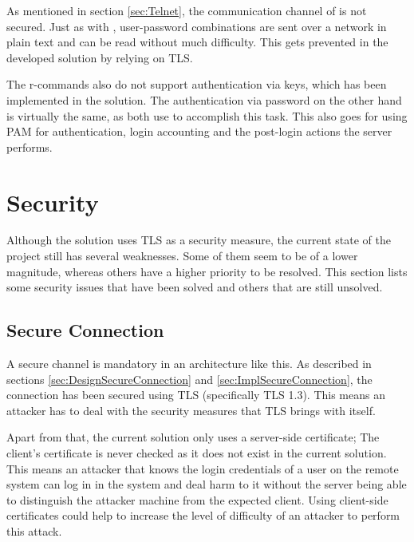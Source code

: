 \documentclass[10pt,a4paper,titlepage,twoside,english,final]{zhawreprt}
\begin{document}
As mentioned in section \ref{sec:Telnet}, the communication channel of \cite{rlogin} is not secured.
Just as with \cite{telnet}, user-password combinations are sent over a network in plain text and can be read without much difficulty.
This gets prevented in the developed solution by relying on \gls{TLS}.

The r-commands also do not support authentication via keys, which has been implemented in the solution.
The authentication via password on the other hand is virtually the same, as both use \cite{login} to accomplish this task.
This also goes for using \gls{PAM} for authentication, \gls{login} accounting and the post-\gls{login} actions the server performs.


\section{Security}\label{sec:Security}
Although the solution uses \gls{TLS} as a security measure, the current state of the project still has several weaknesses.
Some of them seem to be of a lower magnitude, whereas others have a higher priority to be resolved.
This section lists some security issues that have been solved and others that are still unsolved.

\subsection{Secure Connection}\label{ssec:SecSecureConnection}
A secure channel is mandatory in an architecture like this.
As described in sections \ref{sec:DesignSecureConnection} and \ref{sec:ImplSecureConnection}, the connection has been secured using \gls{TLS} (specifically \gls{TLS} 1.3).
This means an attacker has to deal with the security measures that \gls{TLS} brings with itself.

Apart from that, the current solution only uses a server-side certificate;
The client's certificate is never checked as it does not exist in the current solution.
This means an attacker that knows the \gls{login} credentials of a user on the remote system can log in in the system and deal harm to it without the server being able to distinguish the attacker machine from the expected client.
Using client-side certificates could help to increase the level of difficulty of an attacker to perform this attack.
\end{document}
